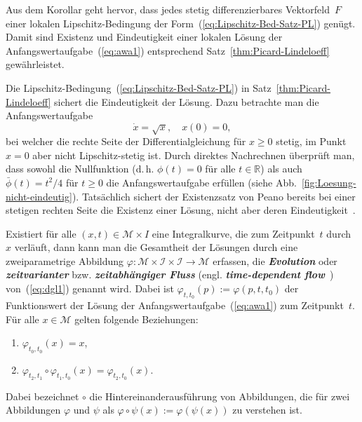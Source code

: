 Aus dem Korollar geht hervor, dass jedes stetig differenzierbares
Vektorfeld~$F$ einer lokalen Lipschitz-Bedingung der Form~(\ref{eq:Lipschitz-Bed-Satz-PL})
genügt. Damit sind Existenz und Eindeutigkeit einer lokalen Lösung
der Anfangswertaufgabe~(\ref{eq:awa1}) entsprechend Satz~\ref{thm:Picard-Lindeloeff}
gewährleistet.

\begin{remark}
\label{rem:Nicht-Lipschitz-Peano}Die Lipschitz-Bedingung~(\ref{eq:Lipschitz-Bed-Satz-PL})
in Satz~\ref{thm:Picard-Lindeloeff} sichert die Eindeutigkeit der
Lösung. Dazu betrachte man die Anfangswertaufgabe
\begin{equation}
\dot{x}=\sqrt{x},\quad x(0)=0,\label{eq:awa-nicht-eindeutig}
\end{equation}
bei welcher die rechte Seite der Differentialgleichung für $x\geq0$
stetig, im Punkt $x=0$ aber nicht Lipschitz-stetig
ist. Durch direktes Nachrechnen überprüft man, dass sowohl die Nullfunktion
(d.\,h. $\phi(t)=0$ für alle $t\in{\mathbb{R}}$) als auch $\bar{\phi}(t)=t^{2}/4$
für $t\geq0$ die Anfangswertaufgabe erfüllen (siehe Abb.~\ref{fig:Loesung-nicht-eindeutig}).
Tatsächlich sichert der Existenzsatz von Peano
bereits bei einer stetigen rechten Seite die Existenz einer Lösung,
nicht aber deren Eindeutigkeit~\cite{amann1995}.
\end{remark}


Existiert für alle $(x,t)\in\mathcal{M}\times I$ eine Integralkurve,
die zum Zeitpunkt~$t$ durch~$x$ verläuft, dann kann man die Gesamtheit
der Lösungen durch eine zweiparametrige Abbildung $\varphi:\mathcal{M}\times\mathcal{I}\times\mathcal{I}\to\mathcal{M}$
erfassen, die \textbf{\em Evolution} oder \textbf{\em zeitvarianter }bzw. \textbf{\em zeitabhängiger
Fluss} (engl. \textbf{\em time-dependent flow}~\cite{bloch2003})
von~(\ref{eq:dgl1}) genannt wird. Dabei ist $\varphi_{t,t_{0}}(p):=\varphi(p,t,t_{0})$
der Funktionswert der Lösung der Anfangswertaufgabe~(\ref{eq:awa1})
zum Zeitpunkt~$t$. Für alle $x\in\mathcal{M}$ gelten folgende Beziehungen:
\begin{enumerate}
\item $\varphi_{t_{0},t_{0}}(x)=x$,
\item $\varphi_{t_{2},t_{1}}\circ\varphi_{t_{1},t_{0}}(x)=\varphi_{t_{2},t_{0}}(x)$.
\end{enumerate}
Dabei bezeichnet $\circ$ die Hintereinanderausführung von Abbildungen,
die für zwei Abbildungen $\varphi$ und $\psi$ als $\varphi\circ\psi(x):=\varphi(\psi(x))$
zu verstehen ist.

